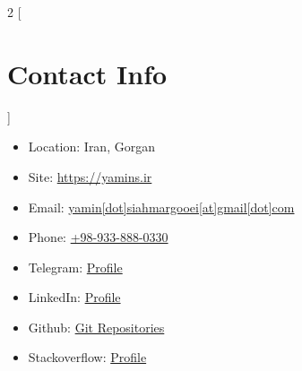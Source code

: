 \begin{multicols}{2}
[\section*{\LARGE{Contact Info}}]
    \begin{itemize}
        \item Location: Iran, Gorgan
        \item Site: \href{https://yamins.ir}{https://yamins.ir}
        \item Email: \href{mailto:yamin.siahmargooei@gmail.com}{yamin[dot]siahmargooei[at]gmail[dot]com}
        \item Phone: \href{tel:0989338880330}{+98-933-888-0330}
        \item Telegram: \href{https://t.me/yamins}{Profile}
        \item LinkedIn: \href{https://linkedin.com/in/yaminsm}{Profile}
        \item Github: \href{https://github.com/yamin8000}{Git Repositories}
        \item Stackoverflow: \href{https://stackoverflow.com/users/15055605/yamin}{Profile}
    \end{itemize}
\end{multicols}